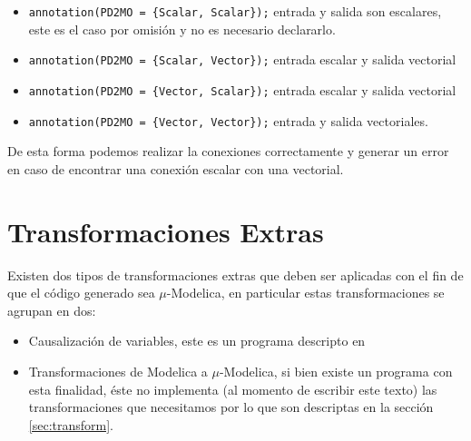 \begin{itemize}
	\item \texttt{annotation(PD2MO = \{Scalar, Scalar\});} entrada y salida son escalares, este es el caso por omisión y no es necesario declararlo.
	\item \texttt{annotation(PD2MO = \{Scalar, Vector\});} entrada escalar y salida vectorial
	\item \texttt{annotation(PD2MO = \{Vector, Scalar\});} entrada escalar y salida vectorial
	\item \texttt{annotation(PD2MO = \{Vector, Vector\});} entrada y salida vectoriales.
\end{itemize}

	De esta forma podemos realizar la conexiones correctamente y generar un error en caso de encontrar una conexión escalar con una vectorial. 

\section{Transformaciones Extras}
	
	Existen dos tipos de transformaciones extras que deben ser aplicadas con el fin de que el código generado sea $\mu$-Modelica, en particular 
	estas transformaciones se agrupan en dos:
	\begin{itemize}
	\item Causalización de variables, este es un programa descripto en \cite{Mod15}
	\item Transformaciones de Modelica a $\mu$-Modelica, si bien existe un programa con esta finalidad, éste no implementa (al momento de escribir este texto)
	las transformaciones que necesitamos por lo que son descriptas en la sección \ref{sec:transform}.
	\end{itemize}
